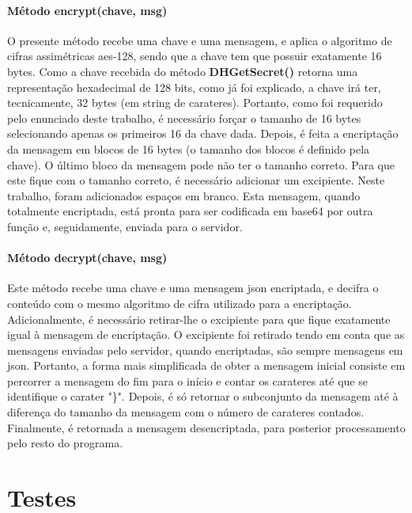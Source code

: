 \documentclass{report}
\begin{document}
\subsubsection{Método encrypt(chave, msg)}
O presente método recebe uma chave e uma mensagem, e aplica o algoritmo de cifras assimétricas \ac{aes}-128, sendo que a chave tem que possuir exatamente 16 bytes. Como a chave recebida do método \textbf{DHGetSecret()} retorna uma representação hexadecimal de 128 bits, como já foi explicado, a chave irá ter, tecnicamente, 32 bytes (em string de carateres). Portanto, como foi requerido pelo enunciado deste trabalho, é necessário forçar o tamanho de 16 bytes selecionando apenas os primeiros 16 da chave dada.\newline
Depois, é feita a encriptação da mensagem em blocos de 16 bytes (o tamanho dos blocos é definido pela chave). O último bloco da mensagem pode não ter o tamanho correto. Para que este fique com o tamanho correto, é necessário adicionar um excipiente. Neste trabalho, foram adicionados espaços em branco.\newline
Esta mensagem, quando totalmente encriptada, está pronta para ser codificada em base64 por outra função e, seguidamente, enviada para o servidor.

\subsubsection{Método decrypt(chave, msg)}
Este método recebe uma chave e uma mensagem \ac{json} encriptada, e decifra o conteúdo com o mesmo algoritmo de cifra utilizado para a encriptação. Adicionalmente, é necessário retirar-lhe o excipiente para que fique exatamente igual à mensagem de encriptação. O excipiente foi retirado tendo em conta que as mensagens enviadas pelo servidor, quando encriptadas, são sempre mensagens em \ac{json}. Portanto, a forma mais simplificada de obter a mensagem inicial consiste em percorrer a mensagem do fim para o início e contar os carateres até que se identifique o carater "\}". Depois, é só retornar o subconjunto da mensagem até à diferença do tamanho da mensagem com o número de carateres contados.\newline
Finalmente, é retornada a mensagem desencriptada, para posterior processamento pelo resto do programa.


\chapter{Testes}
\label{chap.testes}
\end{document}
